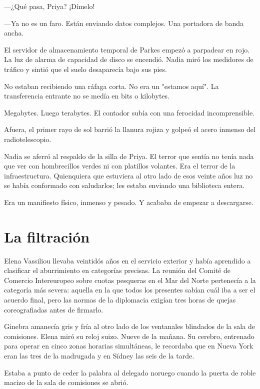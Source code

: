 \documentclass[11pt,a5paper,twoside]{book}
\begin{document}
—¿Qué pasa, Priya? ¡Dímelo!

—Ya no es un faro. Están enviando datos complejos. Una portadora de banda ancha.

El servidor de almacenamiento temporal de Parkes empezó a parpadear en rojo. La luz de alarma de capacidad de disco se encendió. Nadia miró los medidores de tráfico y sintió que el suelo desaparecía bajo sus pies.

No estaban recibiendo una ráfaga corta. No era un "estamos aquí". La transferencia entrante no se medía en bits o kilobytes.

Megabytes. Luego terabytes. El contador subía con una ferocidad incomprensible.

Afuera, el primer rayo de sol barrió la llanura rojiza y golpeó el acero inmenso del radiotelescopio.

Nadia se aferró al respaldo de la silla de Priya. El terror que sentía no tenía nada que ver con hombrecillos verdes ni con platillos volantes. Era el terror de la infraestructura. Quienquiera que estuviera al otro lado de esos veinte años luz no se había conformado con saludarlos; les estaba enviando una biblioteca entera.

Era un manifiesto físico, inmenso y pesado. Y acababa de empezar a descargarse.

\chapter{La filtración}

Elena Vassiliou llevaba veintidós años en el servicio exterior y había aprendido a clasificar el aburrimiento en categorías precisas. La reunión del Comité de Comercio Intereuropeo sobre cuotas pesqueras en el Mar del Norte pertenecía a la categoría más severa: aquella en la que todos los presentes sabían cuál iba a ser el acuerdo final, pero las normas de la diplomacia exigían tres horas de quejas coreografiadas antes de firmarlo.

Ginebra amanecía gris y fría al otro lado de los ventanales blindados de la sala de comisiones. Elena miró su reloj suizo. Nueve de la mañana. Su cerebro, entrenado para operar en cinco zonas horarias simultáneas, le recordaba que en Nueva York eran las tres de la madrugada y en Sídney las seis de la tarde.

Estaba a punto de ceder la palabra al delegado noruego cuando la puerta de roble macizo de la sala de comisiones se abrió.
\end{document}
